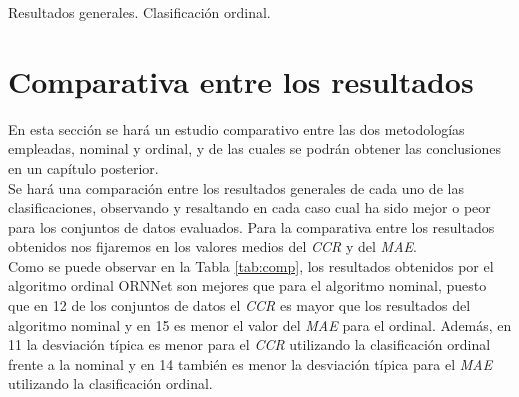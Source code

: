 			\begin{table}[!htbp]
				\centering
				\caption{Resultados generales. Clasificación ordinal.}
				\label{tab:genord}
			\end{table}
	
	\section{Comparativa entre los resultados}
	
		En esta sección se hará un estudio comparativo entre las dos metodologías empleadas, nominal y ordinal, y de las cuales se podrán obtener las conclusiones en un capítulo posterior.\\
		
		Se hará una comparación entre los resultados generales de cada uno de las clasificaciones, observando y resaltando en cada caso cual ha sido mejor o peor para los conjuntos de datos evaluados. Para la comparativa entre los resultados obtenidos nos fijaremos en los valores medios del \textit{CCR} y del \textit{MAE}.\\
		
		Como se puede observar en la Tabla \ref{tab:comp}, los resultados obtenidos por el algoritmo ordinal ORNNet son mejores que para el algoritmo nominal, puesto que en 12 de los conjuntos de datos el \textit{CCR} es mayor que los resultados del algoritmo nominal y en 15 es menor el valor del \textit{MAE} para el ordinal. Además, en 11 la desviación típica es menor para el \textit{CCR} utilizando la clasificación ordinal frente a la nominal y en 14 también es menor la desviación típica para el \textit{MAE} utilizando la clasificación ordinal.
		
		\newpage{\thispagestyle{empty}}
		
